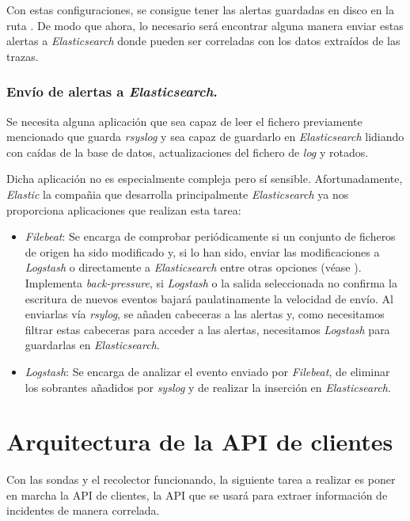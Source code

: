 Con estas configuraciones, se consigue tener las alertas guardadas en disco en la ruta . De modo que ahora, lo necesario será encontrar alguna manera enviar estas alertas a \emph{Elasticsearch} donde pueden ser correladas con los datos extraídos de las trazas.

\subsubsection{Envío de alertas a \emph{Elasticsearch}.}

Se necesita alguna aplicación que sea capaz de leer el fichero previamente mencionado que guarda \emph{rsyslog} y sea capaz de guardarlo
en \emph{Elasticsearch} lidiando con caídas de la base de datos, actualizaciones del fichero de \emph{log} y rotados.

Dicha aplicación no es especialmente compleja pero sí sensible. Afortunadamente, \emph{Elastic} la compañia que desarrolla principalmente
\emph{Elasticsearch} ya nos proporciona aplicaciones que realizan esta tarea:

\begin{itemize}
    \item \emph{Filebeat}: Se encarga de comprobar periódicamente si un conjunto de ficheros de origen ha sido modificado y, si lo han sido,
    enviar las modificaciones a \emph{Logstash} o directamente a \emph{Elasticsearch} entre otras opciones (véase \cite{elastic-filebeat}). Implementa 
    \emph{back-pressure}, si \emph{Logstash} o la salida seleccionada no confirma la escritura de nuevos eventos bajará paulatinamente la velocidad de envío. 
    Al enviarlas vía \emph{rsylog}, se añaden cabeceras a las alertas y, como necesitamos filtrar estas cabeceras para acceder a las alertas, necesitamos \emph{Logstash} para 
    guardarlas en \emph{Elasticsearch}.
    \item \emph{Logstash}: Se encarga de analizar el evento enviado por \emph{Filebeat}, de eliminar los sobrantes añadidos por \emph{syslog} y de realizar la inserción en
    \emph{Elasticsearch}.
\end{itemize}

\section{Arquitectura de la API de clientes}
\label{sec:arquitectura-api-clientes}

Con las sondas y el recolector funcionando, la siguiente tarea a realizar es poner en marcha la API de clientes, 
la API que se usará para extraer información de incidentes de manera correlada.


